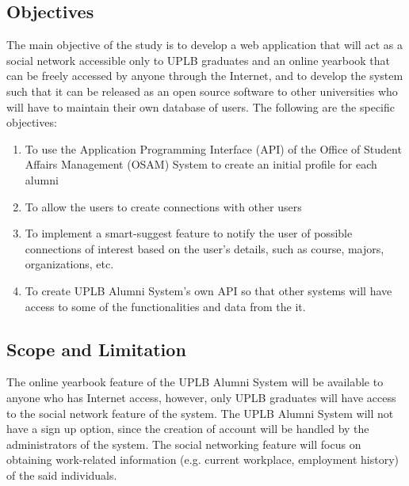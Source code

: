 \documentclass[journal]{./IEEE/IEEEtran}
\begin{document}
\subsection{Objectives}
The main objective of the study is to develop a web application that will act as a social network accessible only to UPLB graduates and an online yearbook that can be freely accessed by anyone through the Internet, and to develop the system such that it can be released as an open source software to other universities who will have to maintain their own database of users. The following are the specific objectives:
	\begin{enumerate}
	\item To use the Application Programming Interface (API) of the Office of Student Affairs Management (OSAM) System to create an initial profile for each alumni
	\item To allow the users to create connections with other users \pubidadjcol
	\item To implement a smart-suggest feature to notify the user of possible connections of interest based on the user's details, such as course, majors, organizations, etc.
	\item To create UPLB Alumni System's own API so that other systems will have access to some of the functionalities and data from the it. 
	\end{enumerate}

\subsection{Scope and Limitation}
The online yearbook feature of the UPLB Alumni System will be available to anyone who has Internet access, however, only UPLB graduates will have access to the social network feature of the system. The UPLB Alumni System will not have a sign up option, since the creation of account will be handled by the administrators of the system. The social networking feature will focus on obtaining work-related information (e.g. current workplace, employment history) of the said individuals. \par

\end{document}
